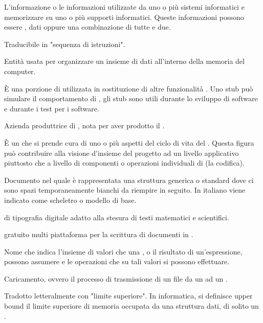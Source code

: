{L'informazione o le informazioni utilizzate da uno o più sistemi informatici e memorizzare su uno o più supporti informatici. Queste informazioni possono essere , dati oppure una combinazione di tutte e due.}

{Traducibile in "sequenza di istruzioni".}

{Entità usata per organizzare un insieme di dati all'interno della memoria del computer.}

{\`{E} una porzione di  utilizzata in sostituzione di altre funzionalità . Uno stub può simulare il comportamento di , gli stub sono utili durante lo sviluppo di software e durante i test per i software.}

{Azienda produttrice di , nota per aver prodotto il  .}

{\`{E} un  che si prende cura di uno o più aspetti del ciclo di vita del . Questa figura può contribuire alla visione d'insieme del progetto ad un livello applicativo piuttosto che a livello di componenti o operazioni individuali di  (la codifica).}


{Documento nel quale è rappresentata una struttura generica o standard dove ci sono spazi temporaneamente bianchi da riempire in seguito. In italiano viene indicato come scheletro o modello di base.}

{ di tipografia digitale adatto alla stesura di testi matematici e scientifici.}

{ gratuito multi piattaforma per la scrittura di documenti in .}

{Nome che indica l'insieme di valori che una , o il risultato di un'espressione, possono assumere e le operazioni che su tali valori si possono effettuare.}


{Caricamento, ovvero il processo di trasmissione di un file da un  ad un .}

{Tradotto letteralmente con "limite superiore". In informatica, si definisce upper bound il limite superiore di memoria occupata da una struttura dati, di solito un .}


